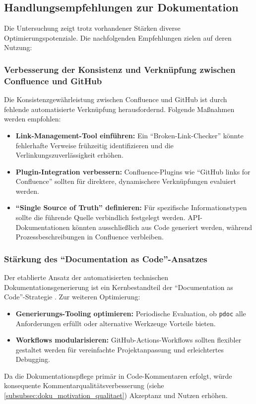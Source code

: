 \documentclass[12pt,oneside]{article}
\begin{document}
    \subsection{Handlungsempfehlungen zur Dokumentation}
    \label{subsec:empfehlungen_dok}
    Die Untersuchung zeigt trotz vorhandener Stärken diverse Optimierungspotenziale. Die nachfolgenden Empfehlungen zielen auf deren Nutzung:

    \subsubsection{Verbesserung der Konsistenz und Verknüpfung zwischen Confluence und GitHub}
    \label{subsubsec:doku_konsistenz_verknuepfung}
    Die Konsistenzgewährleistung zwischen Confluence und GitHub ist durch fehlende automatisierte Verknüpfung herausfordernd. Folgende Maßnahmen werden empfohlen:
    \begin{itemize}
        \item \textbf{Link-Management-Tool einführen:} Ein ``Broken-Link-Checker'' könnte fehlerhafte Verweise frühzeitig identifizieren und die Verlinkungszuverlässigkeit erhöhen.
        \item \textbf{Plugin-Integration verbessern:} Confluence-Plugins wie ``GitHub links for Confluence'' \cite{GitHubLinksForConfluenceMarketplace} sollten für direktere, dynamischere Verknüpfungen evaluiert werden.
        \item \textbf{``Single Source of Truth'' definieren:} Für spezifische Informationstypen sollte die führende Quelle verbindlich festgelegt werden. API-Dokumentationen könnten ausschließlich aus Code generiert werden, während Prozessbeschreibungen in Confluence verbleiben.
    \end{itemize}

    \subsubsection{Stärkung des ``Documentation as Code''-Ansatzes}
    \label{subsubsec:doku_docs_as_code}
    Der etablierte Ansatz der automatisierten technischen Dokumentationsgenerierung ist ein Kernbestandteil der ``Documentation as Code''-Strategie \cite{WriteTheDocsWhatIsDocsAsCode}. Zur weiteren Optimierung:
    \begin{itemize}
        \item \textbf{Generierungs-Tooling optimieren:} Periodische Evaluation, ob \texttt{pdoc} alle Anforderungen erfüllt oder alternative Werkzeuge Vorteile bieten.
        \item \textbf{Workflows modularisieren:} GitHub-Actions-Workflows sollten flexibler gestaltet werden für vereinfachte Projektanpassung und erleichtertes Debugging.
    \end{itemize}
    Da die Dokumentationspflege primär in Code-Kommentaren erfolgt, würde konsequente Kommentarqualitätsverbesserung (siehe \ref{subsubsec:doku_motivation_qualitaet}) Akzeptanz und Nutzen erhöhen.
\end{document}
